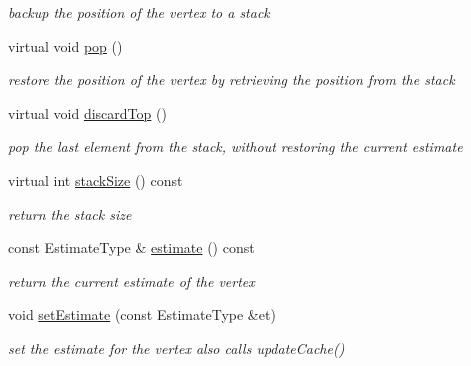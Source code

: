 \begin{DoxyCompactItemize}
\begin{DoxyCompactList}\small\item\em backup the position of the vertex to a stack \end{DoxyCompactList}\item 
\hypertarget{classg2o_1_1BaseVertex_a502bf3db2ee32061a2c8257ef81a1552}{virtual void \hyperlink{classg2o_1_1BaseVertex_a502bf3db2ee32061a2c8257ef81a1552}{pop} ()}\label{classg2o_1_1BaseVertex_a502bf3db2ee32061a2c8257ef81a1552}

\begin{DoxyCompactList}\small\item\em restore the position of the vertex by retrieving the position from the stack \end{DoxyCompactList}\item 
\hypertarget{classg2o_1_1BaseVertex_a71729c4d91044bde9bfea4c859b0c02d}{virtual void \hyperlink{classg2o_1_1BaseVertex_a71729c4d91044bde9bfea4c859b0c02d}{discard\-Top} ()}\label{classg2o_1_1BaseVertex_a71729c4d91044bde9bfea4c859b0c02d}

\begin{DoxyCompactList}\small\item\em pop the last element from the stack, without restoring the current estimate \end{DoxyCompactList}\item 
\hypertarget{classg2o_1_1BaseVertex_ad40208e3c8e3c221560c69af176b2eb6}{virtual int \hyperlink{classg2o_1_1BaseVertex_ad40208e3c8e3c221560c69af176b2eb6}{stack\-Size} () const }\label{classg2o_1_1BaseVertex_ad40208e3c8e3c221560c69af176b2eb6}

\begin{DoxyCompactList}\small\item\em return the stack size \end{DoxyCompactList}\item 
\hypertarget{classg2o_1_1BaseVertex_abb9caa0d2d00af70e95963a11ee9660a}{const Estimate\-Type \& \hyperlink{classg2o_1_1BaseVertex_abb9caa0d2d00af70e95963a11ee9660a}{estimate} () const }\label{classg2o_1_1BaseVertex_abb9caa0d2d00af70e95963a11ee9660a}

\begin{DoxyCompactList}\small\item\em return the current estimate of the vertex \end{DoxyCompactList}\item 
\hypertarget{classg2o_1_1BaseVertex_acb6e8e8f39caa04f62dd93a3dd400e06}{void \hyperlink{classg2o_1_1BaseVertex_acb6e8e8f39caa04f62dd93a3dd400e06}{set\-Estimate} (const Estimate\-Type \&et)}\label{classg2o_1_1BaseVertex_acb6e8e8f39caa04f62dd93a3dd400e06}

\begin{DoxyCompactList}\small\item\em set the estimate for the vertex also calls update\-Cache() \end{DoxyCompactList}\end{DoxyCompactItemize}
